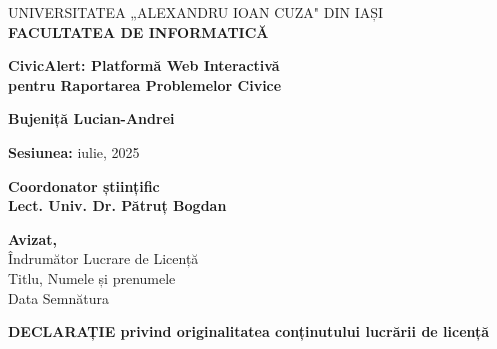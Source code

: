\documentclass[12pt,a4paper]{report}
\begin{document}
\newpage
\begin{center}
\large
UNIVERSITATEA „ALEXANDRU IOAN CUZA" DIN IAȘI\\
\vspace{0.5cm}
\textbf{FACULTATEA DE INFORMATICĂ}\\
\vspace{4cm}

\huge
\textbf{CivicAlert: Platformă Web Interactivă\\pentru Raportarea Problemelor Civice}\\
\vspace{2cm}

\large
\textbf{Bujeniță Lucian-Andrei}\\
\vspace{2cm}

\textbf{Sesiunea:} iulie, 2025\\
\vspace{4cm}

\textbf{Coordonator științific}\\
\textbf{Lect. Univ. Dr.  Pătruț Bogdan}\\

\end{center}

\newpage
\begin{flushright}
\textbf{Avizat,}\\
Îndrumător Lucrare de Licență\\
Titlu, Numele și prenumele \makebox[6cm]{\dotfill}\\
Data \makebox[2cm]{\dotfill} Semnătura \makebox[3cm]{\dotfill}\\
\end{flushright}

\vspace{2cm}

\textbf{DECLARAȚIE privind originalitatea conținutului lucrării de licență}

\vspace{1cm}
\end{document}
